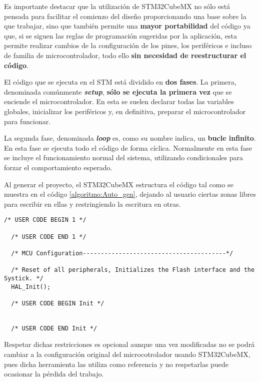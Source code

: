 Es importante destacar que la utilización de STM32CubeMX no sólo está pensada para facilitar el comienzo del diseño proporcionando una base sobre la que trabajar, sino que también permite una \textbf{mayor portabilidad} del código ya que, si se siguen las reglas de programación sugeridas por la aplicación, esta permite realizar cambios de la configuración de los pines, los periféricos e incluso de familia de microcontrolador, todo ello \textbf{sin necesidad de reestructurar el código}.

\clearpage

El código que se ejecuta en el STM está dividido en \textbf{dos fases}. La primera, denominada comúnmente \textbf{\textit{setup}}, \textbf{sólo se ejecuta la primera vez} que se enciende el microcontrolador.
En esta se suelen declarar todas las variables globales, inicializar los periféricos y, en definitiva, preparar el microcontrolador para funcionar.

La segunda fase, denominada \textbf{\textit{loop}} es, como su nombre indica, un \textbf{bucle infinito}. En esta fase se ejecuta todo el código de forma cíclica. Normalmente en esta fase se incluye el funcionamiento normal del sistema, utilizando condicionales para forzar el comportamiento esperado.

Al generar el proyecto, el STM32CubeMX estructura el código tal como se muestra en el código \ref{algoritmo:Auto_gen}, dejando al usuario ciertas zonas libres para escribir en ellas y restringiendo la escritura en otras.

\begin{lstlisting}[label=algoritmo:Auto_gen,style = STM-code,frame=single,caption=Ejemplo de generación de código automáticamente]
  /* USER CODE BEGIN 1 */
	
  /* USER CODE END 1 */

  /* MCU Configuration----------------------------------------*/

  /* Reset of all peripherals, Initializes the Flash interface and the Systick. */
  HAL_Init();

  /* USER CODE BEGIN Init */

	
  /* USER CODE END Init */
\end{lstlisting}

Respetar dichas restricciones es opcional aunque una vez modificadas no se podrá cambiar a la configuración original del microcotrolador usando STM32CubeMX, pues dicha herramienta las utiliza como referencia y no respetarlas puede ocasionar la pérdida del trabajo.

